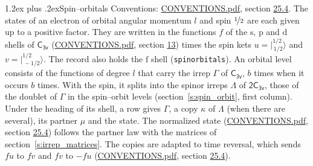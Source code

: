 \documentclass[10pt,a4paper]{article}
\makeatletter
\renewcommand\section{\@startsection{section}{1}{\z@}{-3ex plus -1ex minus -.2ex}%
  {1.2ex plus .2ex}{\normalfont\large\sffamily\bfseries\color{parttitle}}}
\numberwithin{equation}{section}
\newcommand{\grp}[1]{\mathsf{#1}}
\newcommand{\orbital}[1]{\mathrm{#1}}
\newcommand{\mult}{\kappa}
\newcommand{\intx}{\mu}
\newcommand{\jm}[2]{\bigl\lvert{}^{#1}_{\,#2}\bigr\rangle}
\makeatother
\begin{document}
\section{Spin--orbitals}\label{s:spin_orbitals}
Conventions: \href{../../CONVENTIONS.pdf}{CONVENTIONS.pdf}, section \href{../../CONVENTIONS.pdf\#conv.25.4}{25.4}.
\leavevmode\label{n:index.orbital.l}The states of an electron of orbital angular momentum $l$ and spin $\nicefrac{1}{2}$ are each given up to a positive factor. \label{n:local.spinor.uv}\label{n:local.function.f}They are written in the functions $f$ of the $\orbital{s}$, $\orbital{p}$ and $\orbital{d}$ shells of \href{../../../rotation/data/pdf/C3v.pdf}{$\grp{C_{3v}}$} (\href{../../CONVENTIONS.pdf}{CONVENTIONS.pdf}, section \href{../../../rotation/CONVENTIONS.pdf\#conv.13}{13}) times the spin kets $u = \jm{1/2}{1/2}$ and $v = \jm{1/2}{-1/2}$. The record also holds the $\orbital{f}$ shell (\texttt{spinorbitals}). An orbital level consists of the functions of degree $l$ that carry the irrep $\Gamma$ of \href{../../../rotation/data/pdf/C3v.pdf}{$\grp{C_{3v}}$}, $b$ times when it occurs $b$ times. With the spin, it splits into the spinor irreps $\Lambda$ of $\grp{2C_{3v}}$, those of the doublet of $\Gamma$ in the spin--orbit levels (section~\ref{s:spin_orbit}, first column). \label{n:head.state}Under the heading of its shell, a row gives $\Gamma$, a copy $\mult$ of $\Lambda$ (when there are several), its partner $\intx$ and the state. The normalized state (\href{../../CONVENTIONS.pdf}{CONVENTIONS.pdf}, section \href{../../CONVENTIONS.pdf\#conv.25.4}{25.4}) follows the partner law with the matrices of section~\ref{s:irrep_matrices}. The copies are adapted to time reversal, which sends $f u$ to $f v$ and $f v$ to $-f u$ (\href{../../CONVENTIONS.pdf}{CONVENTIONS.pdf}, section \href{../../CONVENTIONS.pdf\#conv.25.4}{25.4}).
\end{document}

